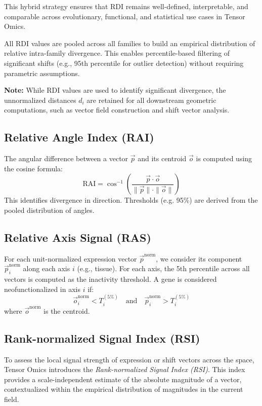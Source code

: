         This hybrid strategy ensures that RDI remains well-defined, interpretable, and comparable across evolutionary, functional, and statistical use cases in Tensor Omics.

        All RDI values are pooled across all families to build an empirical distribution of relative intra-family divergence. This enables percentile-based filtering of significant shifts (e.g., 95th percentile for outlier detection) without requiring parametric assumptions.

        \textbf{Note:} While RDI values are used to identify significant divergence, the unnormalized distances \( d_i \) are retained for all downstream geometric computations, such as vector field construction and shift vector analysis.

    \subsection{Relative Angle Index (RAI)}

        The angular difference between a vector \( \vec{p} \) and its centroid \(
        \vec{o} \) is computed using the cosine formula:
        \[
            \text{RAI} = \cos^{-1} \left( \frac{\vec{p} \cdot \vec{o}}{\|\vec{p}\| \cdot \|\vec{o}\|} \right)
        \]
        This identifies divergence in direction. Thresholds (e.g. 95\%) are derived
        from the pooled distribution of angles.

    \subsection{Relative Axis Signal (RAS)}

         For each unit-normalized expression vector \( \vec{p}^{\text{norm}} \), we consider its component \( \vec{p}^{\text{norm}}_i \) along each axis \( i \) (e.g., tissue). For each axis, the 5th percentile across all vectors is computed as the inactivity threshold. A gene is considered neofunctionalized in axis \( i \) if:
        \[
            \vec{o}^{\text{norm}}_i < T_i^{(5\%)} \quad \text{and} \quad \vec{p}^{\text{norm}}_i > T_i^{(5\%)}
        \]
        where \( \vec{o}^{\text{norm}} \) is the centroid.

    \subsection{Rank-normalized Signal Index (RSI)}\label{sub:rsi}

        To assess the local signal strength of expression or shift vectors across the space, Tensor Omics introduces the \emph{Rank-normalized Signal Index (RSI)}. This index provides a scale-independent estimate of the absolute magnitude of a vector, contextualized within the empirical distribution of magnitudes in the current field.

